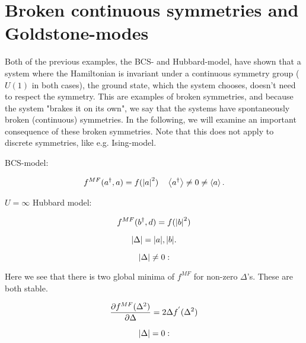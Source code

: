 \section{Broken continuous symmetries and Goldstone-modes}

Both of the previous examples, the BCS- and Hubbard-model, have shown that a system where the Hamiltonian is invariant under a continuous symmetry group ($U(1)$ in both cases), the ground state, which the system chooses, doesn't need to respect the symmetry. This are examples of broken symmetries, and because the system "brakes it on its own", we say that the systems have spontaneously broken (continuous) symmetries. In the following, we will examine an important consequence of these broken symmetries. Note that this does not apply to discrete symmetries, like e.g. Ising-model.  

BCS-model: 

\begin{equation*}
    f^{MF}(a^{\dagger}, a) = f(\abs{a}^2) \quad \expval{a^{\dagger}} \neq 0 \neq \expval{a}.
\end{equation*}

$U = \infty$ Hubbard model: 

\begin{equation*}
    f^{MF}(b^{\dagger}, d) = f(\abs{b}^2) 
\end{equation*}

\begin{equation*}
    \abs{\Delta} = \abs{a}, \abs{b}. 
\end{equation*}

\begin{equation*}
    \abs{\Delta} \neq 0:
\end{equation*}


Here we see that there is two global minima of $f^{MF}$ for non-zero $\Delta$'s. These are both stable. 

\begin{equation*}
    \pdv{f^{MF}(\Delta^2)}{\Delta} = 2\Delta f^{'}(\Delta^2) 
\end{equation*}

\begin{equation*}
     \abs{\Delta} = 0:
\end{equation*}

